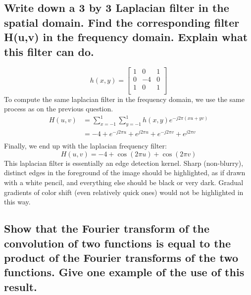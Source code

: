 \documentclass[11pt]{article}
\begin{document}
\subsection{Write down a 3 by 3 Laplacian filter in the spatial domain. Find the corresponding filter H(u,v) in the frequency domain. Explain what this filter can do.}
\[
h(x, y) =
\begin{bmatrix}
1 & 0 & 1\\
0 & -4 & 0\\
1 & 0 & 1\\
\end{bmatrix}
\]
To compute the same laplacian filter in the frequency domain, we use the same process as on the previous question.
\[
\begin{split}
H(u,v) & = \sum_{x=-1}^{1} \sum_{y=-1}^{1} h(x,y) e^{-j2 \pi (xu + yv)} \\
& = -4 + e^{-j2 \pi u} + e^{j2 \pi u} + e^{-j2 \pi v} + e^{j2 \pi v} \\
\end{split}
\]
Finally, we end up with the laplacian frequency filter:
\[
H(u,v) = -4 + \cos(2 \pi u) + \cos(2 \pi v)
\]
This laplacian filter is essentially an edge detection kernel. Sharp (non-blurry), distinct edges in the foreground of the image should be highlighted, as if drawn with a white pencil, and everything else should be black or very dark. Gradual gradients of color shift (even relatively quick ones) would not be highlighted in this way.

\subsection{Show that the Fourier transform of the convolution of two functions is equal to the product of the Fourier transforms of the two functions. Give one example of the use of this result.}
\end{document}
